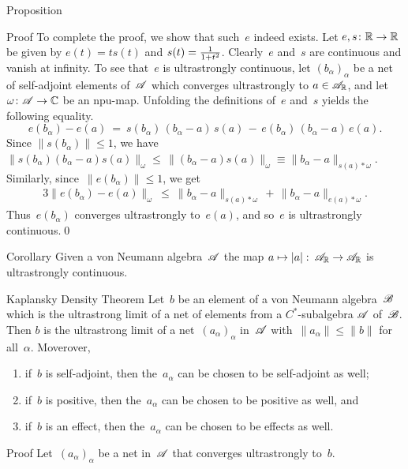 \documentclass[a]{subfiles}
\begin{document}
\begin{parsec}
\begin{point}{Proposition}
\begin{point}{Proof}
To complete the proof,
we show that such~$e$ indeed exists.
Let $e,s\colon \mathbb{R}\to\mathbb{R}$ 
be given by $e(t)=ts(t)$ and $s(t)=\smash{\frac{1}{1+t^2}}$.
Clearly~$e$ and~$s$
are continuous
and
vanish at infinity.
To see that~$e$ is ultrastrongly continuous,
let $(b_\alpha)_\alpha$ be a net of self-adjoint elements of~$\mathscr{A}$
which converges ultrastrongly to $a\in\mathscr{A}_{\mathbb{R}}$,
and let~$\omega\colon \mathscr{A}\to \mathbb{C}$
be an npu-map. 
Unfolding the definitions
of~$e$ and~$s$ yields
the following equality.
\begin{equation*}
e(b_\alpha)-e(a) \ =\ s(b_\alpha)\,(b_\alpha-a)\,s(a)
\,-\, e(b_\alpha)\,(b_\alpha-a)\,e(a).
\end{equation*}
Since $\|s(b_\alpha)\|\leq 1$,
we have $\|s(b_\alpha)(b_\alpha-a)s(a)\|_\omega 
\leq  \,\|(b_\alpha-a)s(a)\|_\omega
\equiv \|b_\alpha-a\|_{s(a)*\omega}$.
Similarly, since~$\|e(b_\alpha)\|\leq 1$,
we get
\begin{alignat*}{3}
\|e(b_\alpha)-e(a)\|_\omega
\ \leq\ \|b_\alpha-a\|_{s(a)*\omega}\,+\,\|b_\alpha-a\|_{e(a)*\omega}.
\end{alignat*}
Thus~$e(b_\alpha)$ converges ultrastrongly to~$e(a)$,
and so~$e$ is ultrastrongly continuous.\qed
\end{point}
\end{point}

\begin{point}{Corollary}%
Given a von Neumann algebra~$\mathscr{A}$
the map $a\mapsto\left|a\right|\colon\,\mathscr{A}_{\mathbb{R}}\to\mathscr{A}_{\mathbb{R}}$
is ultrastrongly continuous.
\end{point}
\begin{point}[kaplansky]{Kaplansky Density Theorem}%
Let~$b$ be an element of a von Neumann algebra~$\mathscr{B}$
which is the ultrastrong limit of a net
of elements
from a $C^*$-subalgebra $\mathscr{A}$ of~$\mathscr{B}$.
Then
$b$ is the ultrastrong limit of a net~$(a_\alpha)_\alpha$
in~$\mathscr{A}$ with~$\|a_\alpha\|\leq\|b\|$ for all~$\alpha$.
Moverover,
\begin{enumerate}
\item
if~$b$ is self-adjoint,
then the~$a_\alpha$ can be chosen to be self-adjoint as well;
\item
if~$b$ is positive,
then the~$a_\alpha$ can be chosen to be positive as well, and
\item
if~$b$ is an effect,
then the~$a_\alpha$ can be chosen to be effects as well.
\end{enumerate}
\begin{point}{Proof}%
Let~$(a_\alpha)_\alpha$
be a net in~$\mathscr{A}$ that converges ultrastrongly
to~$b$.


\end{point}
\end{point}
\end{parsec}
\end{document}
